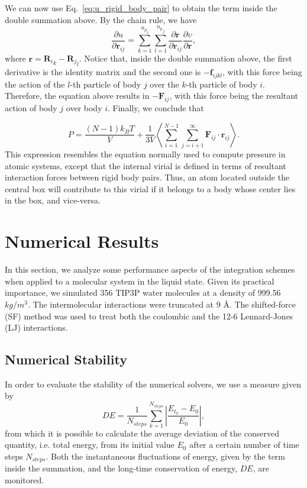 \documentclass[aip,jcp,reprint,amsmath,amssymb,amsfont]{revtex4-1}
\newcommand{\vt}[1]{\boldsymbol{\mathbf{#1}}}           %
\newcommand{\diff}[2]{\dfrac{\partial #1}{\partial #2}} %
\begin{document}
We can now use Eq.~\ref{eq:u_rigid_body_pair} to obtain the term inside the double summation above. By the chain rule, we have
\[
\diff{u}{{\vt r}_{ij}} = \sum_{k=1}^{{n_p}_i} \sum_{l=1}^{{n_p}_j} \diff{\vt r}{\vt r_{ij}} \diff{\upsilon}{\vt r},
\]
where $\vt r = {{\vt R}_i}_k - {{\vt R}_j}_l$. Notice that, inside the double summation above, the first derivative is the identity matrix and the second one is $-{\vt f}_{ijkl}$, with this force being the action of the $l$-th particle of body $j$ over the $k$-th particle of body $i$. Therefore, the equation above results in $-\vt F_{ij}$, with this force being the resultant action of body $j$ over body $i$. Finally, we conclude that

\begin{equation}
\label{eq:pressure}
P = \frac{(N-1) k_B T}{V} + \frac{1}{3V} \left\langle \sum_{i=1}^{N-1} \sum_{j=i+1}^{\infty}{\vt F}_{ij} \cdot {\vt r}_{ij}  \right\rangle.
\end{equation}
This expression resembles the equation normally used to compute pressure in atomic systems, except that the internal virial is defined in terms of resultant interaction forces between rigid body pairs. Thus, an atom located outside the central box will contribute to this virial if it belongs to a body whose center lies in the box, and vice-versa.

\section{Numerical Results}

In this section, we analyze some performance aspects of the integration schemes when applied to a molecular system in the liquid state. Given its practical importance, we simulated 356 TIP3P\cite{Price2004} water molecules at a density of 999.56 $kg/m^3$. The intermolecular interactions were truncated at 9 {\AA}. The shifted-force (SF) method\cite{Allen1989,Toxvaerd_2011} was used to treat both the coulombic and the 12-6 Lennard-Jones (LJ) interactions.

\subsection{Numerical Stability}
\label{sec:performance}

In order to evaluate the stability of the numerical solvers, we use a measure given by
\begin{equation}
\label{eq:performance}
D E =  \frac{1}{N_{steps}} \sum_{k=1}^{N_{steps}} \left| \frac{E_{t_k} - E_0}{E_0} \right|,
\end{equation}
from which it is possible to calculate the average deviation of the conserved quantity, i.e. total energy, from its initial value $E_0$ after a certain number of time steps $N_{steps}$. Both the instantaneous fluctuations of energy, given by the term inside the summation, and the long-time conservation of energy, $D E$, are monitored.  
\end{document}
